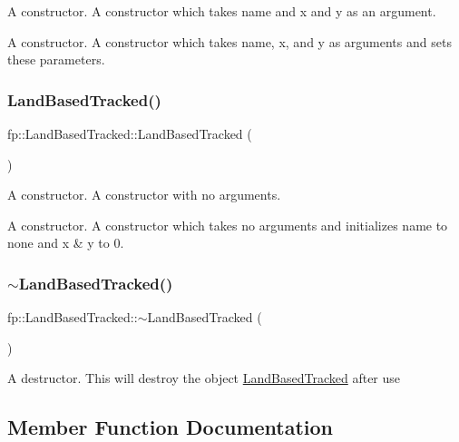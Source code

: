 A constructor. A constructor which takes name and x and y as an argument.

A constructor. A constructor which takes name, x, and y as arguments and sets these parameters. \mbox{\label{classfp_1_1_land_based_tracked_a0f9489dc8ef0310ced4f2526a610a0e0}} 
\subsubsection{\texorpdfstring{Land\+Based\+Tracked()}{LandBasedTracked()}\hspace{0.1cm}{\footnotesize\ttfamily [2/2]}}
{\footnotesize\ttfamily fp\+::\+Land\+Based\+Tracked\+::\+Land\+Based\+Tracked (\begin{DoxyParamCaption}{ }\end{DoxyParamCaption})}

A constructor. A constructor with no arguments.

A constructor. A constructor which takes no arguments and initializes name to none and x \& y to 0. \mbox{\label{classfp_1_1_land_based_tracked_a8d3033324bbc96fde30ce107c1694af3}} 
\subsubsection{\texorpdfstring{$\sim$\+Land\+Based\+Tracked()}{~LandBasedTracked()}}
{\footnotesize\ttfamily fp\+::\+Land\+Based\+Tracked\+::$\sim$\+Land\+Based\+Tracked (\begin{DoxyParamCaption}{ }\end{DoxyParamCaption})\hspace{0.3cm}{\ttfamily [virtual]}}

A destructor. This will destroy the object \hyperlink{classfp_1_1_land_based_tracked}{Land\+Based\+Tracked} after use 

\subsection{Member Function Documentation}
\mbox{\label{classfp_1_1_land_based_tracked_a5c5c280d150b040bd5f862f2f64d83f1}} 
